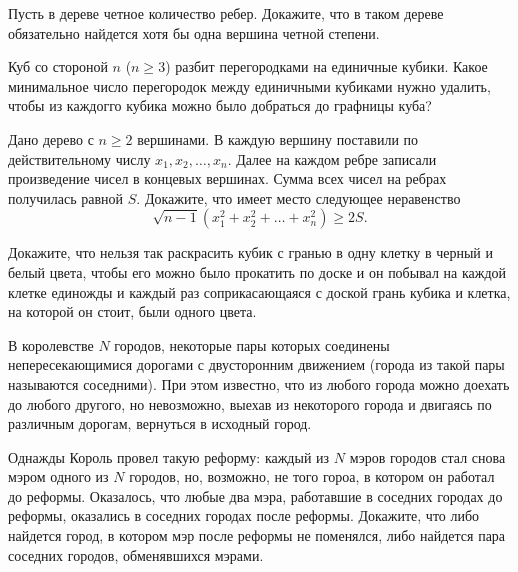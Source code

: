 \begin{exersize}
	Пусть в дереве четное количество ребер. Докажите, что в таком дереве обязательно найдется хотя бы одна вершина четной степени.
\end{exersize}	

\begin{exersize}
	Куб со стороной $n$ ($n \geqslant 3$) разбит перегородками на единичные кубики. Какое минимальное число перегородок между единичными кубиками нужно удалить, чтобы из каждогго кубика можно было добраться до графницы куба?
\end{exersize}	

\begin{exersize}
	Дано дерево с $n \geqslant 2$ вершинами. В каждую вершину поставили по действительному числу $x_1, x_2, \dots, x_n$. Далее на каждом ребре записали произведение чисел в концевых вершинах. Сумма всех чисел на ребрах получилась равной $S$. Докажите, что имеет место следующее неравенство $$\sqrt{n-1} (x_1^2 + x_2^2 + \dots + x_n^2) \geqslant 2S.$$
\end{exersize}	

\begin{exersize}
	Докажите, что нельзя так раскрасить кубик с гранью в одну клетку в черный и белый цвета, чтобы его можно было прокатить по доске и он побывал на каждой клетке единожды и каждый раз соприкасающаяся с доской грань кубика и клетка, на которой он стоит, были одного цвета.
\end{exersize}	

\begin{exersize}
	В королевстве $N$ городов, некоторые пары которых соединены непересекающимися дорогами с двусторонним движением (города из такой пары называются соседними). При этом известно, что из любого города можно доехать до любого другого, но невозможно, выехав из некоторого города и двигаясь по различным дорогам, вернуться в исходный город.
	
	Однажды Король провел такую реформу: каждый из $N$ мэров городов стал снова мэром одного из $N$ городов, но, возможно, не того гороа, в котором он работал до реформы. Оказалось, что любые два мэра, работавшие в соседних городах до реформы, оказались в соседних городах после реформы. Докажите, что либо найдется город, в котором мэр после реформы не поменялся, либо найдется пара соседних городов, обменявшихся мэрами.
\end{exersize}	 